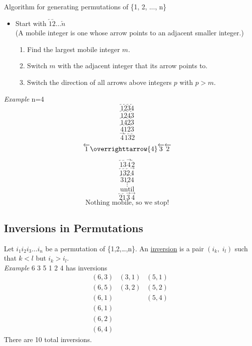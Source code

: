 \documentclass[12pt]{article}
\begin{document}
Algorithm for generating permutations of \{1, 2, ..., n\}
\begin{itemize}
    \item Start with $\overleftarrow{1} \overleftarrow{2} \ldots \overleftarrow{n}$\\
    (A mobile integer is one whose arrow points to an adjacent smaller integer.)
    
    \begin{enumerate}
        \item Find the largest mobile integer $m$. 
        \item Switch $m$ with the adjacent integer that its arrow points to.
        \item Switch the direction of all arrows above integers $p$ with $p>m$.
    \end{enumerate}
\end{itemize}

{\sl Example} n=4
$$\overleftarrow{1}\overleftarrow{2}\overleftarrow{3}\overleftarrow{4}$$
$$\overleftarrow{1}\overleftarrow{2}\overleftarrow{4}\overleftarrow{3}$$
$$\overleftarrow{1}\overleftarrow{4}\overleftarrow{2}\overleftarrow{3}$$
$$\overleftarrow{4}\overleftarrow{1}\overleftarrow{2}\overleftarrow{3}$$
$$\overrightarrow{4}\overleftarrow{1}\overleftarrow{3}\overleftarrow{2}$$
$$\overleftarrow{1}\overrighttarrow{4}\overleftarrow{3}\overleftarrow{2}$$
$$\overleftarrow{1}\overleftarrow{3}\overrightarrow{4}\overleftarrow{2}$$
$$\overleftarrow{1}\overleftarrow{3}\overleftarrow{2}\overrightarrow{4}$$
$$\overleftarrow{3}\overleftarrow{1}\overleftarrow{2}\overleftarrow{4}$$
$$\vdots$$
$$\text{until}$$
$$\overleftarrow{2}\overleftarrow{1}\overrightarrow{3}\overrightarrow{4}$$
$$\text{Nothing mobile, so we stop!}$$

\vspace{2\baselineskip}
\subsection{Inversions in Permutations}
Let $i_1i_2i_3\ldots i_n$ be a permutation of \{1,2,\ldots,n\}. An \underline{inversion} is a pair $(i_k,\;i_l)$ such that $k<l$ but $i_k>i_l$.\\

{\sl Example } 6 3 5 1 2 4 has inversions
\begin{align*}
    &(6,3) & (3,1) & (5,1)\\
    &(6,5) & (3,2) & (5,2)\\
    &(6,1) &     & (5,4)\\
    &(6,1) &     &\\
    &(6,2) &     &\\
    &(6,4) &     &
\end{align*}
There are 10 total inversions. \\
\end{document}
